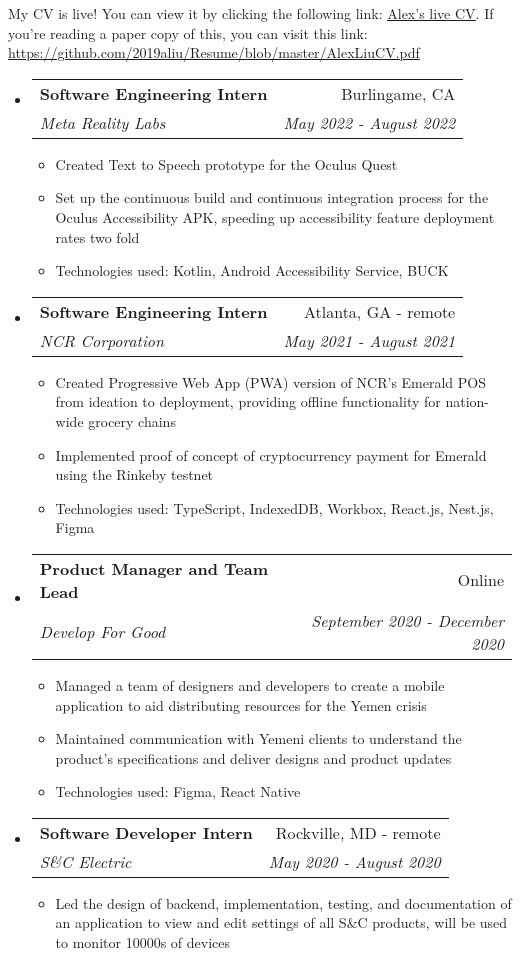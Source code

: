\documentclass[letterpaper,11pt]{article}
\makeatletter
\newcommand{\resitem}[1]{\item #1 \vspace{-2pt}}
\newcommand{\ressubheading}[4]{
\begin{tabular*}{7.0in}{l@{\extracolsep{\fill}}r}
		\textbf{#1} & #2 \\
		\textit{#3} & \textit{#4} \\
\end{tabular*}\vspace{-6pt}}
\makeatother
\begin{document}
\vspace{1em}
My CV is live! You can view it by clicking the following link: \underline{\href{https://github.com/2019aliu/Resume/blob/master/AlexLiuCV.pdf}{Alex's live CV}}. If you're reading a paper copy of this, you can visit this link: \url{https://github.com/2019aliu/Resume/blob/master/AlexLiuCV.pdf}

\begin{itemize}
\item
    \ressubheading{Software Engineering Intern}{Burlingame, CA}{Meta Reality Labs}{May 2022 - August 2022}
    \begin{itemize}
        \resitem{Created Text to Speech prototype for the Oculus Quest}
        \resitem{Set up the continuous build and continuous integration process for the Oculus Accessibility APK, speeding up accessibility feature deployment rates two fold}
        \resitem{Technologies used: Kotlin, Android Accessibility Service, BUCK}
    \end{itemize}
\item
    \ressubheading{Software Engineering Intern}{Atlanta, GA - remote}{NCR Corporation}{May 2021 - August 2021}
    \begin{itemize}
        \resitem{Created Progressive Web App (PWA) version of NCR's Emerald POS from ideation to deployment, providing offline functionality for nation-wide grocery chains}
        \resitem{Implemented proof of concept of cryptocurrency payment for Emerald using the Rinkeby testnet}
        \resitem{Technologies used: TypeScript, IndexedDB, Workbox, React.js, Nest.js, Figma}
    \end{itemize}
\item
    \ressubheading{Product Manager and Team Lead}{Online}{Develop For Good}{September 2020 - December 2020}
    \begin{itemize}
        \resitem{Managed a team of designers and developers to create a mobile application to aid distributing resources for the Yemen crisis}
        \resitem{Maintained communication with Yemeni clients to understand the product's specifications and deliver designs and product updates}
        \resitem{Technologies used: Figma, React Native}
    \end{itemize}
\item
    \ressubheading{Software Developer Intern}{Rockville, MD - remote}{S\&C Electric}{May 2020 - August 2020}
    \begin{itemize}
        \resitem{Led the design of backend, implementation, testing, and documentation of an application to view and edit settings of all S\&C products, will be used to monitor 10000s of devices}

\end{itemize}
\end{itemize}
\end{document}
